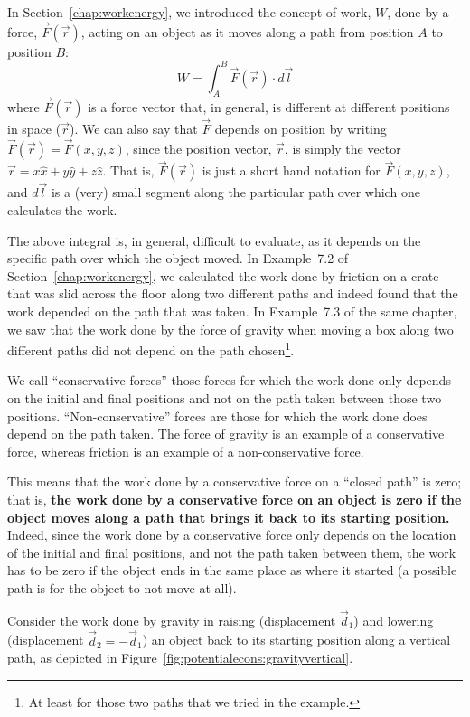 In Section~\ref{chap:workenergy}, we introduced the concept of work, $W$, done by a force, $\vec F(\vec r)$, acting on an object as it moves along a path from position $A$ to position $B$:
\begin{equation}
\label{eq:potentialecons:workdef}
W = \int_A^B \vec F(\vec r) \cdot d\vec l
\end{equation}
where $\vec F(\vec r)$ is a force vector that, in general, is different at different positions in space ($\vec r$). We can also say that $\vec F$ depends on position by writing $\vec F(\vec r)=\vec F(x,y,z)$, since the position vector, $\vec r$, is simply the vector $\vec r = x\hat x + y \hat y+ z\hat z$. That is, $\vec F(\vec r)$ is just a short hand notation for $\vec F(x,y,z)$, and $d\vec l$ is a (very) small segment along the particular path over which one calculates the work.

The above integral is, in general, difficult to evaluate, as it depends on the specific path over which the object moved. In Example~7.2 of Section~\ref{chap:workenergy}, we calculated the work done by friction on a crate that was slid across the floor along two different paths and indeed found that the work depended on the path that was taken. In Example~7.3 of the same chapter, we saw that the work done by the force of gravity when moving a box along two different paths did not depend on the path chosen\footnote{At least for those two paths that we tried in the example.}.

We call ``conservative forces'' those forces for which the work done only depends on the initial and final positions and not on the path taken between those two positions. ``Non-conservative'' forces are those for which the work done does depend on the path taken. The force of gravity is an example of a conservative force, whereas friction is an example of a non-conservative force.

This means that the work done by a conservative force on a ``closed path'' is zero; that is, \textbf{the work done by a conservative force on an object is zero if the object moves along a path that brings it back to its starting position.}
Indeed, since the work done by a conservative force only depends on the location of the initial and final positions, and not the path taken between them, the work has to be zero if the object ends in the same place as where it started (a possible path is for the object to not move at all).

Consider the work done by gravity in raising (displacement $\vec d_1$) and lowering (displacement $\vec d_2= -\vec d_1$) an object back to its starting position along a vertical path, as depicted in Figure~\ref{fig:potentialecons:gravityvertical}.

